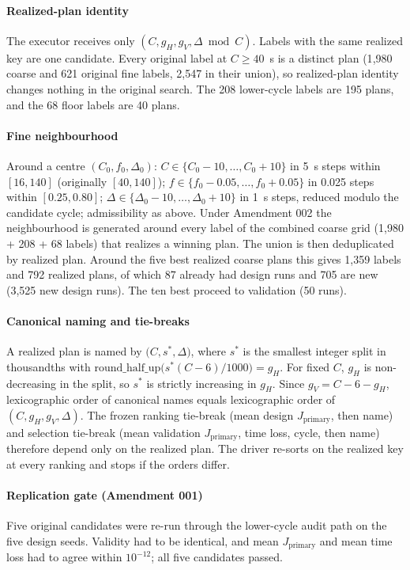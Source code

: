 \documentclass[12pt]{article}
\newcommand{\Jp}{J_{\mathrm{primary}}}
\begin{document}
\paragraph{Realized-plan identity} The executor receives only
$(C,g_H,g_V,\Delta\bmod C)$. Labels with the same realized key are one
candidate. Every original label at $C\geq40$~s is a distinct plan
(1{,}980 coarse and 621 original fine labels, 2{,}547 in their union),
so realized-plan identity changes nothing in the original search. The
208 lower-cycle labels are 195 plans, and the 68 floor labels are 40
plans.

\paragraph{Fine neighbourhood} Around a centre $(C_0,f_0,\Delta_0)$:
$C\in\{C_0-10,\dots,C_0+10\}$ in 5~s steps within $[16,140]$ (originally
$[40,140]$); $f\in\{f_0-0.05,\dots,f_0+0.05\}$ in 0.025 steps within
$[0.25,0.80]$; $\Delta\in\{\Delta_0-10,\dots,\Delta_0+10\}$ in 1~s steps,
reduced modulo the candidate cycle; admissibility as above. Under
Amendment 002 the neighbourhood is generated around every label of the
combined coarse grid (1{,}980 + 208 + 68 labels) that realizes a winning
plan. The union is then deduplicated by realized plan. Around the five
best realized coarse plans this gives 1{,}359 labels and 792 realized
plans, of which 87 already had design runs and 705 are new (3{,}525 new
design runs). The ten best proceed to validation (50 runs).

\paragraph{Canonical naming and tie-breaks} A realized plan is named by
$\bigl(C,s^\ast,\Delta\bigr)$, where $s^\ast$ is the smallest integer
split in thousandths with $\mathrm{round\_half\_up}\bigl(s^\ast(C-6)/1000\bigr)=g_H$.
For fixed $C$, $g_H$ is non-decreasing in the split, so $s^\ast$ is
strictly increasing in $g_H$. Since $g_V=C-6-g_H$, lexicographic order of
canonical names equals lexicographic order of $(C,g_H,g_V,\Delta)$. The
frozen ranking tie-break (mean design $\Jp$, then name) and selection
tie-break (mean validation $\Jp$, time loss, cycle, then name) therefore
depend only on the realized plan. The driver re-sorts on the realized
key at every ranking and stops if the orders differ.

\paragraph{Replication gate (Amendment 001)} Five original candidates
were re-run through the lower-cycle audit path on the five design seeds.
Validity had to be identical, and mean $\Jp$ and mean time loss had to
agree within $10^{-12}$; all five candidates passed.
\end{document}
